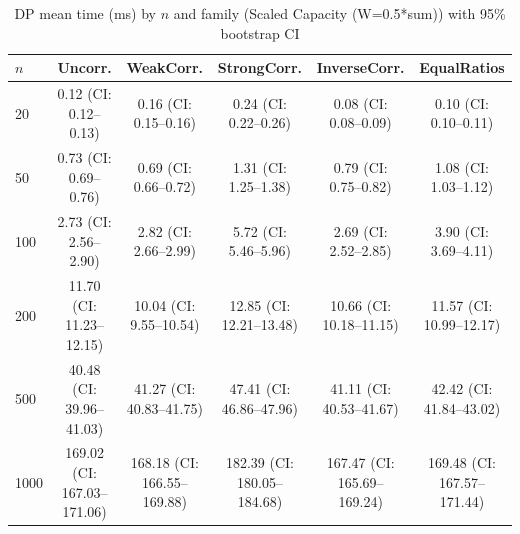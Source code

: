 \begin{table}[tb]
\centering
\caption{DP mean time (ms) by $n$ and family (Scaled Capacity (W=0.5*sum)) with 95\% bootstrap CI}
\label{tab:scaled-dp-scaling}
\begin{tabular}{lccccc}
\toprule
$n$ & Uncorr. & WeakCorr. & StrongCorr. & InverseCorr. & EqualRatios \\
\midrule
20 & 0.12 (CI: 0.12–0.13) & 0.16 (CI: 0.15–0.16) & 0.24 (CI: 0.22–0.26) & 0.08 (CI: 0.08–0.09) & 0.10 (CI: 0.10–0.11) \\
50 & 0.73 (CI: 0.69–0.76) & 0.69 (CI: 0.66–0.72) & 1.31 (CI: 1.25–1.38) & 0.79 (CI: 0.75–0.82) & 1.08 (CI: 1.03–1.12) \\
100 & 2.73 (CI: 2.56–2.90) & 2.82 (CI: 2.66–2.99) & 5.72 (CI: 5.46–5.96) & 2.69 (CI: 2.52–2.85) & 3.90 (CI: 3.69–4.11) \\
200 & 11.70 (CI: 11.23–12.15) & 10.04 (CI: 9.55–10.54) & 12.85 (CI: 12.21–13.48) & 10.66 (CI: 10.18–11.15) & 11.57 (CI: 10.99–12.17) \\
500 & 40.48 (CI: 39.96–41.03) & 41.27 (CI: 40.83–41.75) & 47.41 (CI: 46.86–47.96) & 41.11 (CI: 40.53–41.67) & 42.42 (CI: 41.84–43.02) \\
1000 & 169.02 (CI: 167.03–171.06) & 168.18 (CI: 166.55–169.88) & 182.39 (CI: 180.05–184.68) & 167.47 (CI: 165.69–169.24) & 169.48 (CI: 167.57–171.44) \\
\bottomrule
\end{tabular}
\end{table}
